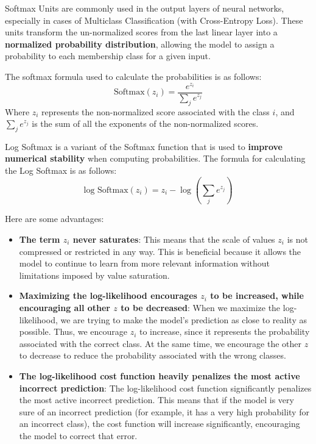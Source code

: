 Softmax Units are commonly used in the output layers of neural networks, especially in cases of Multiclass Classification (with Cross-Entropy Loss). These units transform the un-normalized scores from the last linear layer into a \textbf{normalized probability distribution}, allowing the model to assign a probability to each membership class for a given input.

The softmax formula used to calculate the probabilities is as follows:
$$
\text{Softmax}(z_i) = \frac{e^{z_i}}{\sum_{j} e^{z_j}}
$$
Where \( z_i \) represents the non-normalized score associated with the class \( i \), and \( \sum_{j} e^{z_j} \) is the sum of all the exponents of the non-normalized scores.

Log Softmax is a variant of the Softmax function that is used to \textbf{improve numerical stability} when computing probabilities. The formula for calculating the Log Softmax is as follows:
$$
\text{log Softmax}(z_i) = z_i - \log\left(\sum_{j} e^{z_j}\right)
$$

Here are some advantages:
\begin{itemize}
    \item \textbf{The term \( z_i \) never saturates}: This means that the scale of values \( z_i \) is not compressed or restricted in any way. This is beneficial because it allows the model to continue to learn from more relevant information without limitations imposed by value saturation.
    
    \item \textbf{Maximizing the log-likelihood encourages \( z_i \) to be increased, while encouraging all other \( z \) to be decreased}: When we maximize the log-likelihood, we are trying to make the model's prediction as close to reality as possible. Thus, we encourage \( z_i \) to increase, since it represents the probability associated with the correct class. At the same time, we encourage the other \( z \) to decrease to reduce the probability associated with the wrong classes.
    
    \item \textbf{The log-likelihood cost function heavily penalizes the most active incorrect prediction}: The log-likelihood cost function significantly penalizes the most active incorrect prediction. This means that if the model is very sure of an incorrect prediction (for example, it has a very high probability for an incorrect class), the cost function will increase significantly, encouraging the model to correct that error.
\end{itemize}


